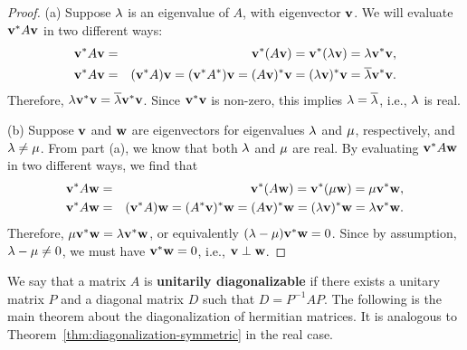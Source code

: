 \begin{proof}
  (a) Suppose $\lambda$ is an eigenvalue of $A$, with eigenvector
  $\vect{v}$. We will evaluate $\vect{v}^{\adjoint}A\vect{v}$ in two
  different ways:
  \begin{eqnarray*}
    \vect{v}^{\adjoint}A\vect{v}
    &=& \vect{v}^{\adjoint}(A\vect{v})
        = \vect{v}^{\adjoint}(\eigenvar\vect{v})
        = \eigenvar\vect{v}^{\adjoint}\vect{v}, \\
    \vect{v}^{\adjoint}A\vect{v}
    &=& (\vect{v}^{\adjoint}A)\vect{v}
        = (\vect{v}^{\adjoint}A^{\adjoint})\vect{v}
        = (A\vect{v})^{\adjoint}\vect{v}
        = (\eigenvar\vect{v})^{\adjoint}\vect{v}
        = \conjugate{\eigenvar}\vect{v}^{\adjoint}\vect{v}.
  \end{eqnarray*}
  Therefore,
  $\eigenvar\vect{v}^{\adjoint}\vect{v} =
  \conjugate{\eigenvar}\vect{v}^{\adjoint}\vect{v}$. Since
  $\vect{v}^{\adjoint}\vect{v}$ is non-zero, this implies
  $\lambda=\overline{\lambda}$, i.e., $\lambda$ is real.

  \noindent
  (b) Suppose $\vect{v}$ and $\vect{w}$ are eigenvectors for
  eigenvalues $\lambda$ and $\mu$, respectively, and
  $\lambda\neq\mu$. From part (a), we know that both
  $\lambda$ and $\mu$ are real.  By evaluating
  $\vect{v}^{\adjoint}A\vect{w}$ in two different ways, we find that
  \begin{eqnarray*}
    \vect{v}^{\adjoint}A\vect{w}
    &=& \vect{v}^{\adjoint}(A\vect{w})
    = \vect{v}^{\adjoint}(\eigenvarB\vect{w})
    = \eigenvarB \vect{v}^{\adjoint}\vect{w}, \\
    \vect{v}^{\adjoint}A\vect{w}
    &=& (\vect{v}^{\adjoint}A)\vect{w}
    = (A^{\adjoint}\vect{v})^{\adjoint}\vect{w}
    = (A\vect{v})^{\adjoint}\vect{w}
    = (\eigenvarA\vect{v})^{\adjoint}\vect{w}
    = \eigenvarA\vect{v}^{\adjoint}\vect{w}.
  \end{eqnarray*}
  Therefore,
  $\eigenvarB\vect{v}^{\adjoint}\vect{w} = \eigenvarA\vect{v}^{\adjoint}\vect{w}$, or
  equivalently $(\eigenvarA - \eigenvarB)\vect{v}^{\adjoint}\vect{w} =
  0$. Since by assumption, $\lambda - \mu\neq 0$, we must
  have $\vect{v}^{\adjoint}\vect{w} = 0$, i.e., $\vect{v}\orth\vect{w}$.
\end{proof}

We say that a matrix $A$ is \textbf{unitarily diagonalizable}%
%
%
%
%
 if there exists a unitary
matrix $P$ and a diagonal matrix $D$ such that $D = P^{-1}AP$.  The
following is the main theorem about the diagonalization of hermitian
matrices. It is analogous to
Theorem~\ref{thm:diagonalization-symmetric} in the real case.


